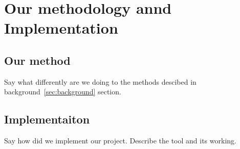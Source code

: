 \section{Our methodology annd Implementation}
\label{sec:implementation}

\subsection{Our method}
\label{sec:method}

Say what differently are we doing to the methods 
descibed in background~\ref{sec:background} section. 

\subsection{Implementaiton}
\label{sec:implementation}

Say how did we implement our project. Describe the tool 
and its working.